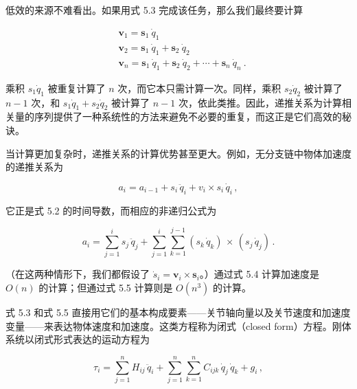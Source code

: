 \documentclass[10pt,a4paper]{book}
\theoremstyle{thmstyle} %
\theoremstyle{defstyle} %
\theoremstyle{prostyle} %
\begin{document}
低效的来源不难看出。如果用式 5.3 完成该任务，那么我们最终要计算



$$
\begin{aligned}&\boldsymbol{v}_{1}=\boldsymbol{s}_1\:\dot{q}_1\\&\boldsymbol{v}_{2}=\boldsymbol{s}_1\:\dot{q}_1+\boldsymbol{s}_2\:\dot{q}_2\\&\boldsymbol{v}_{n}=\boldsymbol{s}_1\:\dot{q}_1+\boldsymbol{s}_2\:\dot{q}_2+\cdots+\boldsymbol{s}_n\:\dot{q}_n\:.\end{aligned}
$$



乘积 $s_{1}\dot{q}_{1}$ 被重复计算了 $n$ 次，而它本只需计算一次。同样，乘积 $s_{2}\dot{q}_{2}$ 被计算了 $n-1$ 次，和 $s_{1}\dot{q}_{1}+s_{2}\dot{q}_{2}$ 被计算了 $n-1$ 次，依此类推。因此，递推关系为计算相关量的序列提供了一种系统性的方法来避免不必要的重复，而这正是它们高效的秘诀。



当计算更加复杂时，递推关系的计算优势甚至更大。例如，无分支链中物体加速度的递推关系为



$$
a _ { i } = a _ { i - 1 } + s _ { i } \, \ddot { q } _ { i } + v _ { i } \times s _ { i } \, \dot { q } _ { i } \, ,
$$



它正是式 5.2 的时间导数，而相应的非递归公式为



$$
a _ { i } = \sum _ { j = 1 } ^{i} s _ { j } \, \ddot { q } _ { j } + \sum _ { j = 1 } ^{i} \sum _ { k = 1 } ^{j - 1} ( s _ { k } \, \dot { q } _ { k } ) \, \times \, ( s _ { j } \, \dot { q } _ { j } ) \, .
$$



（在这两种情形下，我们都假设了 $\dot{s}_{i}=\boldsymbol{v}_{i}\times\boldsymbol{s}_{i}$。）通过式 5.4 计算加速度是 $O(n)$ 的计算；但通过式 5.5 计算则是 $O(n^{3})$ 的计算。



式 5.3 和式 5.5 直接用它们的基本构成要素——关节轴向量以及关节速度和加速度变量——来表达物体速度和加速度。这类方程称为闭式（closed form）方程。刚体系统以闭式形式表达的运动方程为



$$
\tau _ { i } = \sum _ { j = 1 } ^{n} H _ { i j } \, \ddot { q } _ { i } + \sum _ { j = 1 } ^{n} \sum _ { k = 1 } ^{n} C _ { i j k } \, \dot { q } _ { j } \, \dot { q } _ { k } + g _ { i } \, ,
$$
\end{document}
